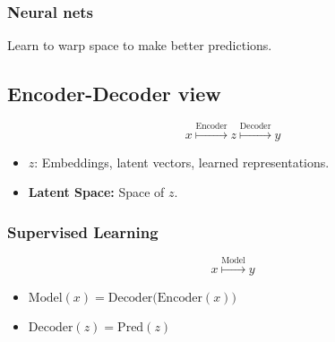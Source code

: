 \subsubsection{Neural nets}
\begin{notes} Learn to warp space to make better predictions.
\end{notes}

\subsection{Encoder-Decoder view}
\begin{definition}
    \begin{equation}
        x \overset{\text{Encoder}}{\mapsto} z \overset{\text{Decoder}}{\mapsto} y
    \end{equation}
    \begin{itemize}
        \item $z$: Embeddings, latent vectors, learned representations.
        \item \textbf{Latent Space:} Space of $z$.
    \end{itemize}
\end{definition}

\subsubsection{Supervised Learning}
\begin{example} 
    \begin{equation}
        x \overset{\text{Model}}{\mapsto} y
    \end{equation}
    \begin{itemize}
        \item $\mathrm{Model}(x) = \mathrm{Decoder}\bigl(\mathrm{Encoder}(x)\bigr)$
        \item $\mathrm{Decoder}(z) = \mathrm{Pred}(z)$
    \end{itemize}
    
\end{example}

